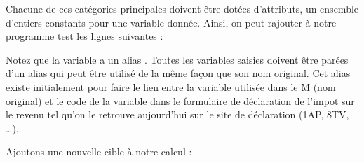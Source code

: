 \documentclass[letterpaper,10pt,french]{sphinxmanual}
\begin{document}
\sphinxAtStartPar
Chacune de ces catégories principales doivent être dotées d’attributs,
un ensemble d’entiers constants pour une variable donnée.
Ainsi, on peut rajouter à notre programme test les lignes suivantes :

\begin{sphinxVerbatim}[commandchars=\\\{\}]
    
    
         
       
\end{sphinxVerbatim}

\sphinxAtStartPar
Notez que la variable  a un alias .
Toutes les variables saisies doivent être parées d’un alias qui peut être
utilisé de la même façon que son nom original.
Cet alias existe initialement pour faire le lien entre la variable utilisée
dans le M (nom original) et le code de la variable dans le formulaire de
déclaration de l’impot sur le revenu tel qu’on le retrouve aujourd’hui sur
le site de déclaration (1AP, 8TV, …).

\sphinxAtStartPar
Ajoutons une nouvelle cible à notre calcul :

\begin{sphinxVerbatim}[commandchars=\\\{\}]
 
  
 
 
 
    
 
 
 
\end{sphinxVerbatim}
\end{document}
